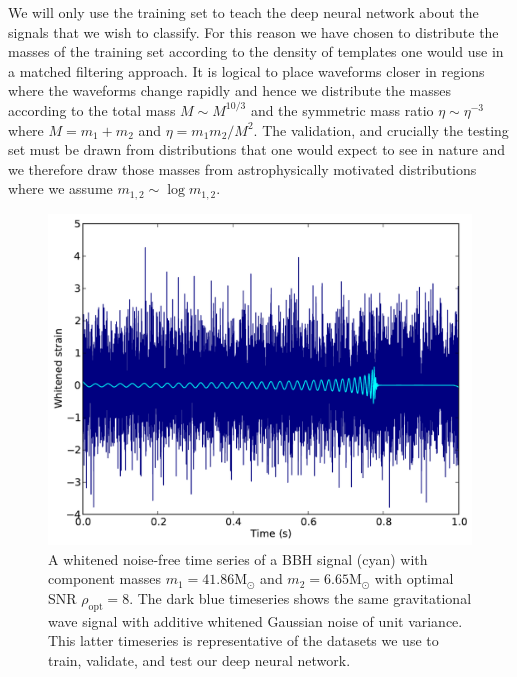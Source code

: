 \documentclass[%
showpacs,
 amsmath,amssymb,
 aps,
 twocolumn,
 prl,
 reprint,
floatfix,
]{revtex4-1}
\newcommand{\optsnr}{\rho_{\mathrm{opt}}}
\begin{document}
%
%
We will only use the training set to teach the deep neural network about the
signals that we wish to classify. For this reason we have chosen to distribute
the masses of the training set according to the density of templates one would
use in a matched filtering approach. It is logical to place waveforms closer in
regions where the waveforms change rapidly and hence we distribute the masses
according to the total mass $M\sim M^{10/3}$ and the symmetric mass ratio
$\eta\sim \eta^{-3}$ where $M=m_{1}+m_{2}$ and $\eta=m_{1}m_{2}/M^{2}$. The
validation, and crucially the testing set must be drawn from distributions that
one would expect to see in nature and we therefore draw those masses from
astrophysically motivated distributions where we assume $m_{1,2}\sim
\log{m_{1,2}}$.   


\begin{figure} 
\includegraphics[width=\columnwidth]{figures/waveform.pdf}
\caption{A whitened noise-free time series of a \ac{BBH}
signal (cyan) with component masses $m_{1}=41.86\mathrm{M}_{\odot}$ and
$m_{2}=6.65\mathrm{M}_{\odot}$ with optimal \ac{SNR} $\optsnr=8$. The dark blue
timeseries shows the same gravitational wave signal with additive whitened
Gaussian noise of unit variance. This latter timeseries is representative of
the datasets we use to train, validate, and test our deep neural network.\label{fig:waveform}}
\end{figure}
\end{document}
